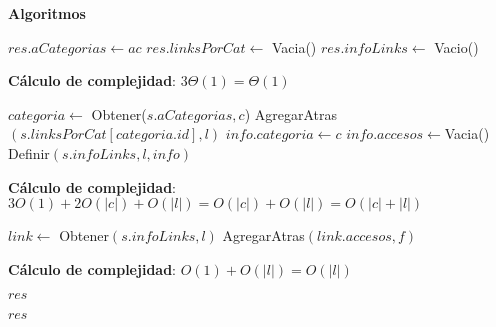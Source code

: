 \documentclass[10pt, a4paper]{article}
\let\TipoVariable=\texttt
\let\ModificadorArgumento=\textbf
\newcommand{\In}[2]{\ModificadorArgumento{in} \ensuremath{#1}\,: \TipoVariable{#2}\xspace}
\newcommand{\Inout}[2]{\ModificadorArgumento{in/out} \ensuremath{#1}\,: \TipoVariable{#2}\xspace}
\newenvironment{Servicios Usados}{%
  \vspace*{2ex}
  \noindent\textbf{\Large Servicios Usados}%
  \vspace*{2ex}
}{}
\newenvironment{Algoritmos}{%
  \vspace*{2ex}%
  \noindent\textbf{\Large Algoritmos}%
  \vspace*{2ex}%
}{}
\newcommand{\DRef}{\ensuremath{\rightarrow}}
\begin{document}
\begin{Algoritmos}

\begin{algorithm}[H]
\caption*{iCrearLinkLinkIt(\In{ac}{abCat}) $\DRef res$ : \TipoVariable{LinkLinkIt}}
\begin{algorithmic}[1]
	\State $res.aCategorias \gets ac$
	\State $res.linksPorCat \gets$ Vacia()
	\State $res.infoLinks \gets$ Vacio()
\end{algorithmic}
\textbf{C\'alculo de complejidad}: $3\Theta(1) = \Theta(1)$
\end{algorithm}

\begin{algorithm}[H]
\caption*{iAgregarLink(\Inout{s}{LinkLinkIt}, \In{l}{link}, \In{c}{categoria})}
\begin{algorithmic}[1]
	\State $categoria \gets$ Obtener($s.aCategorias, c$)
	\State AgregarAtras$(s.linksPorCat[categoria.id], l)$
	\Statex
	\State $info.categoria \gets c$
	\State $info.accesos \gets $Vacia()
	\State Definir$(s.infoLinks, l, info)$
\end{algorithmic}
\textbf{C\'alculo de complejidad}: $3O(1) + 2O(|c|) + O(|l|) = O(|c|) + O(|l|) = O(|c| + |l|)$
\end{algorithm}

\begin{algorithm}[H]
\caption*{iAccederLink(\Inout{s}{LinkLinkIt}, \In{l}{link}, \In{f}{fecha})}
\begin{algorithmic}[1]
	\State $link \gets$ Obtener$(s.infoLinks, l)$
	\State AgregarAtras$(link.accesos, f)$
\end{algorithmic}
\textbf{C\'alculo de complejidad}: $O(1) + O(|l|) = O(|l|)$
\end{algorithm}

\begin{algorithm}[H]
\caption*{iCantLinks(\Inout{s}{LinkLinkIt}, \In{c}{categoria}) $\DRef res$ : \TipoVariable{Nat}}
\begin{algorithmic}[1]
	\State $res$
\end{algorithmic}
\end{algorithm}

\begin{algorithm}[H]
\caption*{iLinksOrdenadosPorAccesos(\Inout{s}{LinkLinkIt}, \In{c}{categoria}) $\DRef res$ : \TipoVariable{itLinks}}
\begin{algorithmic}[1]
	\State $res$
\end{algorithmic}
\end{algorithm}

\end{Algoritmos}
\end{document}
